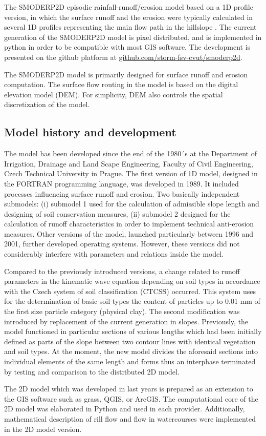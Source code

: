 The SMODERP2D episodic rainfall-runoff/erosion model  based on a 1D profile
version, in which the surface runoff and the erosion were typically calculated
in several 1D profiles representing the main flow path in the hillslope
\cite{Dostal2000}.  The current generation of the SMODERP2D model is pixel
distributed, and is implemented in python in order to be compatible with most
GIS software. The development is presented on the github platform at
\href{https://github.com/storm-fsv-cvut/smoderp2d}{github.com/storm-fsv-cvut/smoderp2d}.

The SMODERP2D model is primarily designed for surface runoff and erosion
computation. The surface flow routing in the model is based on the digital
elevation model (DEM). For simplicity, DEM also controls the spatial
discretization of the model. 


\subsection{Model history and development}
The model has been developed since the end of the 1980´s at the Department of
Irrigation, Drainage and Land Scape Engineering, Faculty of Civil Engineering,
Czech Technical University in Prague. The first version of 1D model, designed
in the FORTRAN programming language, was developed in 1989. It included
processes influencing surface runoff and erosion. Two basically independent
submodels: (i) submodel 1 used for the calculation of admissible slope length
and designing of soil conservation measures, (ii) submodel 2 designed for the
calculation of runoff characteristics in order to implement technical
anti-erosion measures. Other versions of the model, launched particularly
between 1996 and 2001, further developed operating systems. However, these
versions did not considerably interfere with parameters and relations inside
the model.  

Compared to the previously introduced versions, a change related to runoff
parameters in the kinematic wave equation depending on soil types in accordance
with the Czech system of soil classification (CTCSS) occurred. This system uses
for the determination of basic soil types the content of particles up to 0.01
mm of the first size particle category (physical clay). The second modification
was introduced by replacement of the current generation in slopes. Previously,
the model functioned in particular sections of various lengths which had been
initially defined as parts of the slope between two contour lines with
identical vegetation and soil types. At the moment, the new model divides the
aforesaid sections into individual elements of the same length and forms thus
an interphase terminated by testing and comparison to the distributed 2D model. 

The 2D model which was developed in last years is prepared as an extension to
the GIS software such as grass, QGIS, or  ArcGIS. The computational core of the
2D model was elaborated in Python and used in each provider. Additionally,
mathematical description of rill flow and flow in watercourses were implemented
in the 2D model version.

